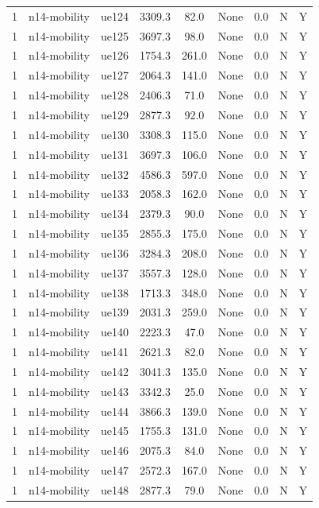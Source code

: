 \begin{table}[ht]
\begin{tabular}{|c|c|c|c|c|c|c|c|c|}
1 & n14-mobility & ue124 & 3309.3 & 82.0 & None & 0.0 & N & Y \\
1 & n14-mobility & ue125 & 3697.3 & 98.0 & None & 0.0 & N & Y \\
1 & n14-mobility & ue126 & 1754.3 & 261.0 & None & 0.0 & N & Y \\
1 & n14-mobility & ue127 & 2064.3 & 141.0 & None & 0.0 & N & Y \\
1 & n14-mobility & ue128 & 2406.3 & 71.0 & None & 0.0 & N & Y \\
1 & n14-mobility & ue129 & 2877.3 & 92.0 & None & 0.0 & N & Y \\
1 & n14-mobility & ue130 & 3308.3 & 115.0 & None & 0.0 & N & Y \\
1 & n14-mobility & ue131 & 3697.3 & 106.0 & None & 0.0 & N & Y \\
1 & n14-mobility & ue132 & 4586.3 & 597.0 & None & 0.0 & N & Y \\
1 & n14-mobility & ue133 & 2058.3 & 162.0 & None & 0.0 & N & Y \\
1 & n14-mobility & ue134 & 2379.3 & 90.0 & None & 0.0 & N & Y \\
1 & n14-mobility & ue135 & 2855.3 & 175.0 & None & 0.0 & N & Y \\
1 & n14-mobility & ue136 & 3284.3 & 208.0 & None & 0.0 & N & Y \\
1 & n14-mobility & ue137 & 3557.3 & 128.0 & None & 0.0 & N & Y \\
1 & n14-mobility & ue138 & 1713.3 & 348.0 & None & 0.0 & N & Y \\
1 & n14-mobility & ue139 & 2031.3 & 259.0 & None & 0.0 & N & Y \\
1 & n14-mobility & ue140 & 2223.3 & 47.0 & None & 0.0 & N & Y \\
1 & n14-mobility & ue141 & 2621.3 & 82.0 & None & 0.0 & N & Y \\
1 & n14-mobility & ue142 & 3041.3 & 135.0 & None & 0.0 & N & Y \\
1 & n14-mobility & ue143 & 3342.3 & 25.0 & None & 0.0 & N & Y \\
1 & n14-mobility & ue144 & 3866.3 & 139.0 & None & 0.0 & N & Y \\
1 & n14-mobility & ue145 & 1755.3 & 131.0 & None & 0.0 & N & Y \\
1 & n14-mobility & ue146 & 2075.3 & 84.0 & None & 0.0 & N & Y \\
1 & n14-mobility & ue147 & 2572.3 & 167.0 & None & 0.0 & N & Y \\
1 & n14-mobility & ue148 & 2877.3 & 79.0 & None & 0.0 & N & Y \\

\end{tabular}
\end{table}
